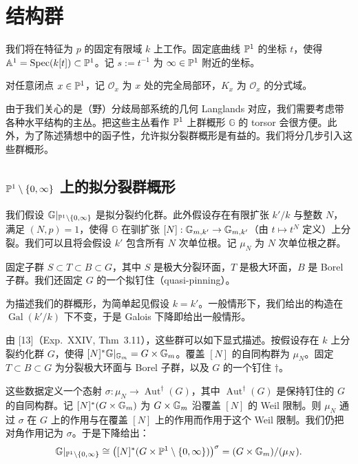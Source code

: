
\section{结构群}

我们将在特征为 $p$ 的固定有限域 $k$ 上工作。固定底曲线 $\mathbb{P}^1$ 的坐标 $t$，使得 $\mathbb{A}^1=\operatorname{Spec}(k[t])\subset\mathbb{P}^1$。记 $s:=t^{-1}$ 为 $\infty\in\mathbb{P}^1$ 附近的坐标。

对任意闭点 $x\in\mathbb{P}^1$，记 $\mathcal O_x$ 为 $x$ 处的完全局部环，$K_x$ 为 $\mathcal O_x$ 的分式域。

由于我们关心的是（野）分歧局部系统的几何 Langlands 对应，我们需要考虑带各种水平结构的主丛。把这些主丛看作 $\mathbb{P}^1$ 上群概形 $\mathbb{G}$ 的 torsor 会很方便。此外，为了陈述猜想中的函子性，允许拟分裂群概形是有益的。我们将分几步引入这些群概形。

\subsection{$\mathbb{P}^1\setminus\{0,\infty\}$ 上的拟分裂群概形}

我们假设 $\mathbb{G}|_{\mathbb{P}^1\setminus\{0,\infty\}}$ 是拟分裂约化群。此外假设存在有限扩张 $k'/k$ 与整数 $N$，满足 $(N,p)=1$，使得 $\mathbb{G}$ 在驯扩张 $[N]:\mathbb{G}_{m,k'}\to\mathbb{G}_{m,k'}$（由 $t\mapsto t^N$ 定义）上分裂。我们可以且将会假设 $k'$ 包含所有 $N$ 次单位根。记 $\mu_N$ 为 $N$ 次单位根之群。

固定子群 $S\subset T\subset B\subset G$，其中 $S$ 是极大分裂环面，$T$ 是极大环面，$B$ 是 Borel 子群。我们还固定 $G$ 的一个拟钉住（quasi-pinning）。

为描述我们的群概形，为简单起见假设 $k=k'$。一般情形下，我们给出的构造在 $\operatorname{Gal}(k'/k)$ 下不变，于是 Galois 下降即给出一般情形。

由 [13]（Exp.~XXIV, Thm~3.11），这些群可以如下显式描述。按假设存在 $k$ 上分裂约化群 $G$，使得 $[N]^*\mathbb{G}|_{\mathbb{G}_m}=G\times\mathbb{G}_m$。覆盖 $[N]$ 的自同构群为 $\mu_N$。固定 $T\subset B\subset G$ 为分裂极大环面与 Borel 子群，以及 $G$ 的一个钉住 $\dagger$。

这些数据定义一个态射 $\sigma:\mu_N\to\operatorname{Aut}^\dagger(G)$，其中 $\operatorname{Aut}^\dagger(G)$ 是保持钉住的 $G$ 的自同构群。记 $[N]^*(G\times\mathbb{G}_m)$ 为 $G\times\mathbb{G}_m$ 沿覆盖 $[N]$ 的 Weil 限制。则 $\mu_N$ 通过 $\sigma$ 在 $G$ 上的作用与在覆盖 $[N]$ 上的作用而作用于这个 Weil 限制。我们仍把对角作用记为 $\sigma$。于是下降给出：
\[
\mathbb{G}|_{\mathbb{P}^1\setminus\{0,\infty\}}\cong\big([N]^*(G\times\mathbb{P}^1\setminus\{0,\infty\})\big)^\sigma
=(G\times\mathbb{G}_m)/(\mu_N).
\]

